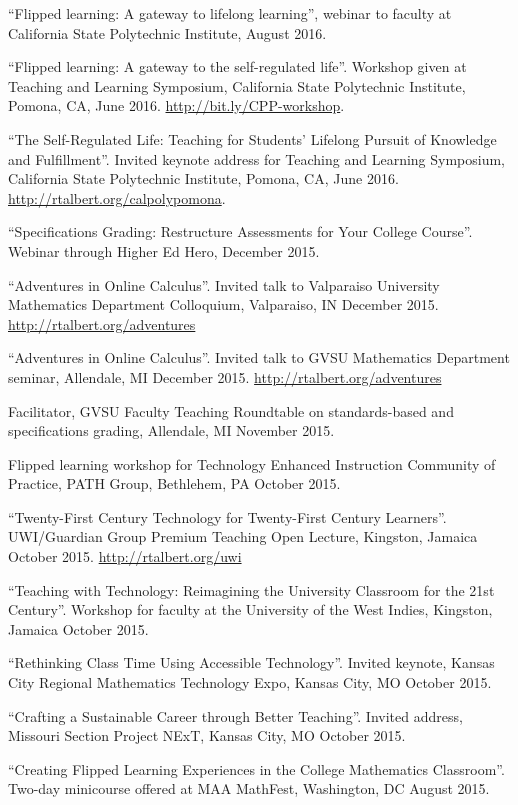 \documentclass[letterpaper]{article}
\renewenvironment{itemize}{
  \begin{list}{}{
    \setlength{\leftmargin}{1.5em}
	\setlength{\itemsep}{0in}
  }
}{
  \end{list}
}
\begin{document}
\begin{itemize}
	\item ``Flipped learning: A gateway to lifelong learning'', webinar to faculty at California State Polytechnic Institute, August 2016.
	\item ``Flipped learning: A gateway to the self-regulated life''. Workshop given at Teaching and Learning Symposium, California State Polytechnic Institute, Pomona, CA, June 2016. \url{http://bit.ly/CPP-workshop}.
	\item ``The Self-Regulated Life: Teaching for Students' Lifelong Pursuit of Knowledge and Fulfillment''. Invited keynote address for Teaching and Learning Symposium, California State Polytechnic Institute, Pomona, CA, June 2016. \url{http://rtalbert.org/calpolypomona}.
	\item ``Specifications Grading: Restructure Assessments for Your College Course''. Webinar through Higher Ed Hero, December 2015.
	\item ``Adventures in Online Calculus''. Invited talk to Valparaiso University Mathematics Department Colloquium, Valparaiso, IN December 2015. \url{http://rtalbert.org/adventures}
	\item ``Adventures in Online Calculus''. Invited talk to GVSU Mathematics Department seminar, Allendale, MI December 2015. \url{http://rtalbert.org/adventures}
	\item Facilitator, GVSU Faculty Teaching Roundtable on standards-based and specifications grading, Allendale, MI November 2015.
	\item Flipped learning workshop for Technology Enhanced Instruction Community of Practice, PATH Group, Bethlehem, PA October 2015.
	\item ``Twenty-First Century Technology for Twenty-First Century Learners''. UWI/Guardian Group Premium Teaching Open Lecture, Kingston, Jamaica October 2015. \url{http://rtalbert.org/uwi}
	\item ``Teaching with Technology: Reimagining the University Classroom for the 21st Century''. Workshop for faculty at the University of the West Indies, Kingston, Jamaica October 2015.
	\item ``Rethinking Class Time Using Accessible Technology''. Invited keynote, Kansas City Regional Mathematics Technology Expo, Kansas City, MO October 2015.
	\item ``Crafting a Sustainable Career through Better Teaching''. Invited address, Missouri Section Project NExT, Kansas City, MO October 2015.
	\item ``Creating Flipped Learning Experiences in the College Mathematics Classroom''. Two-day minicourse offered at MAA MathFest, Washington, DC August 2015.

\end{itemize}
\end{document}
